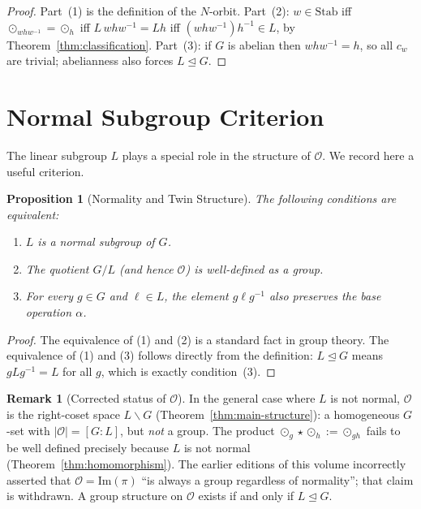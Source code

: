 \documentclass[11pt,a4paper,openany]{book}
\theoremstyle{plain}
\newtheorem{proposition}[theorem]{Proposition}
\theoremstyle{definition}
\newtheorem{remark}[theorem]{Remark}
\newcommand{\twing}[1]{\odot_{#1}}
\newcommand{\opspace}{\mathcal{O}}
\newcommand{\lingroup}{L}
\newcommand{\groupG}{G}
\newcommand{\Img}{\mathrm{Im}}
\begin{document}
\begin{proof}
Part~(1) is the definition of the $N$-orbit. Part~(2): $w\in\mathrm{Stab}$ iff $\twing{whw^{-1}}=\twing{h}$ iff $\lingroup\,whw^{-1}=\lingroup h$ iff $(whw^{-1})h^{-1}\in\lingroup$, by Theorem~\ref{thm:classification}. Part~(3): if $\groupG$ is abelian then $whw^{-1}=h$, so all $c_w$ are trivial; abelianness also forces $\lingroup\trianglelefteq\groupG$.
\end{proof}

\section{Normal Subgroup Criterion}

The linear subgroup $\lingroup$ plays a special role in the structure of $\opspace$. We record here a useful criterion.

\begin{proposition}[Normality and Twin Structure]\label{prop:normality}
The following conditions are equivalent:
\begin{enumerate}
    \item $\lingroup$ is a normal subgroup of $\groupG$.
    \item The quotient $\groupG / \lingroup$ (and hence $\opspace$) is well-defined as a group.
    \item For every $g \in \groupG$ and $\ell \in \lingroup$, the element $g\ell g^{-1}$ also preserves the base operation $\alpha$.
\end{enumerate}
\end{proposition}

\begin{proof}
The equivalence of (1) and (2) is a standard fact in group theory. The equivalence of (1) and (3) follows directly from the definition: $\lingroup \trianglelefteq \groupG$ means $g\lingroup g^{-1} = \lingroup$ for all $g$, which is exactly condition~(3).
\end{proof}

\begin{remark}[Corrected status of $\opspace$]
In the general case where $\lingroup$ is not normal, $\opspace$ is the right-coset space $\lingroup\backslash\groupG$ (Theorem~\ref{thm:main-structure}): a homogeneous $\groupG$-set with $|\opspace|=[\groupG:\lingroup]$, but \emph{not} a group. The product $\twing{g}\star\twing{h}:=\twing{gh}$ fails to be well defined precisely because $\lingroup$ is not normal (Theorem~\ref{thm:homomorphism}). The earlier editions of this volume incorrectly asserted that $\opspace=\Img(\pi)$ ``is always a group regardless of normality''; that claim is withdrawn. A group structure on $\opspace$ exists if and only if $\lingroup\trianglelefteq\groupG$.
\end{remark}
\end{document}
